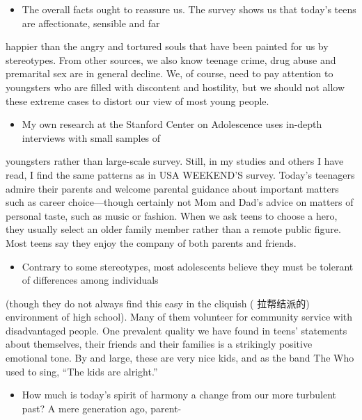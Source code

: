 \documentclass[UTF8,11pt]{ctexart}
\begin{document}
\begin{itemize}[leftmargin=2em,itemsep=.2em,topsep=.4em]\item[C.] The overall facts ought to reassure us. The survey shows us that today’s teens are affectionate, sensible and far
\end{itemize}

happier than the angry and tortured souls that have been painted for us by stereotypes. From other sources, we also know teenage crime, drug abuse and premarital sex are in general decline. We, of course, need to pay attention to youngsters who are filled with discontent and hostility, but we should not allow these extreme cases to distort our view of most young people.


\begin{itemize}[leftmargin=2em,itemsep=.2em,topsep=.4em]\item[D.] My own research at the Stanford Center on Adolescence uses in-depth interviews with small samples of
\end{itemize}

youngsters rather than large-scale survey. Still, in my studies and others I have read, I find the same patterns as in USA WEEKEND’S survey. Today’s teenagers admire their parents and welcome parental guidance about important matters such as career choice—though certainly not Mom and Dad’s advice on matters of personal taste, such as music or fashion. When we ask teens to choose a hero, they usually select an older family member rather than a remote public figure. Most teens say they enjoy the company of both parents and friends.


\begin{itemize}[leftmargin=2em,itemsep=.2em,topsep=.4em]\item[E.] Contrary to some stereotypes, most adolescents believe they must be tolerant of differences among individuals
\end{itemize}

(though they do not always find this easy in the cliquish ( 拉帮结派的) environment of high school). Many of them volunteer for community service with disadvantaged people. One prevalent quality we have found in teens’ statements about themselves, their friends and their families is a strikingly positive emotional tone. By and large, these are very nice kids, and as the band The Who used to sing, “The kids are alright.”


\begin{itemize}[leftmargin=2em,itemsep=.2em,topsep=.4em]\item[F.] How much is today’s spirit of harmony a change from our more turbulent past? A mere generation ago, parent-
\end{itemize}
\end{document}
